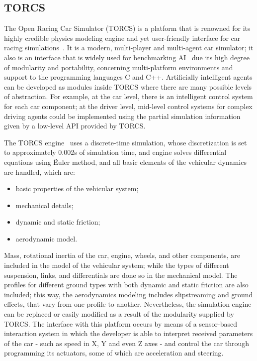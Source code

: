 \subsection{TORCS} \label{subsec:TORCS}

	The Open Racing Car Simulator (TORCS) is a platform that is renowned for its highly credible physics modeling engine and yet user-friendly interface for car racing simulations~\cite{TORCS}. It is a modern, multi-player and multi-agent car simulator; it also is an interface that is widely used for benchmarking AI~\cite{2009} due its high degree of modularity and portability, concerning multi-platform environments and support to the programming languages C and C++. Artificially intelligent agents can be developed as modules inside TORCS where there are many possible levels of abstraction. For example, at the car level, there is an intelligent control system for each car component; at the driver level, mid-level control systems for complex driving agents could be implemented using the partial simulation information given by a low-level API provided by TORCS.

	The TORCS engine~\cite{SIMUTORCS} uses a discrete-time simulation, whose discretization is set to approximately 0.002s of simulation time, and engine solves differential equations using \"{E}uler method, and all basic elements of the vehicular dynamics are handled, which are:

	\begin{itemize}
		
		\item basic properties of the vehicular system;
		
		\item mechanical details;
		
		\item dynamic and static friction;
		
		\item aerodynamic model.
		
	\end{itemize}

	Mass, rotational inertia of the car, engine, wheels, and other components, are included in the model of the vehicular system; while the types of different suspension, links, and differentials are done so in the mechanical model. The profiles for different ground types with both dynamic and static friction are also included; this way, the aerodynamics modeling includes slipstreaming and ground effects, that vary from one profile to another. Nevertheless, the simulation engine can be replaced or easily modified as a result of the modularity supplied by TORCS. The interface with this platform occurs by means of a sensor-based interaction system in which the developer is able to interpret received parameters of the car - such as speed in X, Y and even Z axes - and control the car through programming its actuators, some of which are acceleration and steering.
	

